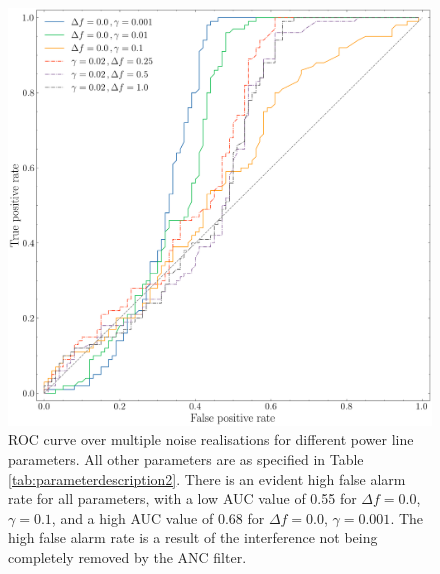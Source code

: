 \documentclass[pra,superscriptaddress,reprint,amsmath,amssymb,nofootinbib]{revtex4-2}
\begin{document}
\begin{figure}
	\begin{center}
			\includegraphics[width=\columnwidth]{images/4C_roccurve.png}
		\end{center}
	\caption{ROC curve over multiple noise realisations for different power line parameters. All other parameters are as specified in Table \ref{tab:parameterdescription2}. There is an evident high false alarm rate for all parameters, with a low AUC value of 0.55 for $\Delta f =0.0$, $\gamma=0.1$, and a high AUC value of 0.68 for $\Delta f =0.0$, $\gamma=0.001$. The high false alarm rate is a result of the interference not being completely removed by the ANC filter.}
	\label{fig:roc1}
\end{figure}
\end{document}

